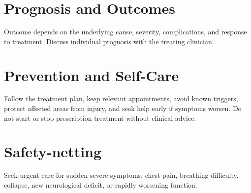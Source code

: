 \section*{Prognosis and Outcomes}
Outcome depends on the underlying cause, severity, complications, and response to treatment. Discuss individual prognosis with the treating clinician.

\section*{Prevention and Self-Care}
Follow the treatment plan, keep relevant appointments, avoid known triggers, protect affected areas from injury, and seek help early if symptoms worsen. Do not start or stop prescription treatment without clinical advice.
\section*{Safety-netting}
Seek urgent care for sudden severe symptoms, chest pain, breathing difficulty, collapse, new neurological deficit, or rapidly worsening function.
